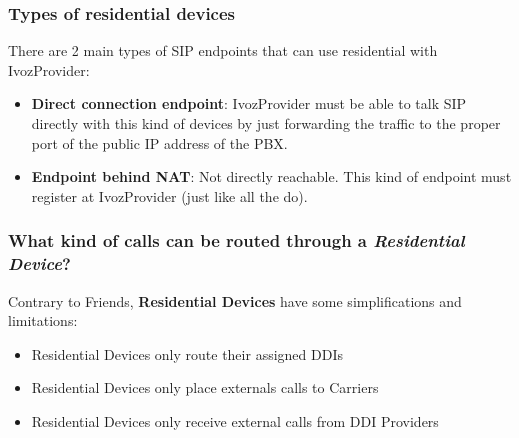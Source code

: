 \documentclass[letterpaper,10pt,english]{sphinxmanual}
\begin{document}
\subsubsection{Types of residential devices}
\label{administration_portal/client/residential/residential_devices:types-of-residential-devices}
There are 2 main types of SIP endpoints that can use residential with IvozProvider:
\begin{itemize}
\item {} 
\textbf{Direct connection endpoint}: IvozProvider must be able to talk SIP directly with
this kind of devices by just forwarding the traffic to the proper port of
the public IP address of the PBX.

\item {} 
\textbf{Endpoint behind NAT}: Not directly reachable. This kind of endpoint must register at
IvozProvider (just like all the {\hyperref[administration_portal/client/vpbx/terminals:terminals]{}} do).

\end{itemize}


\subsubsection{What kind of calls can be routed through a \emph{Residential Device}?}
\label{administration_portal/client/residential/residential_devices:what-kind-of-calls-can-be-routed-through-a-residential-device}
Contrary to Friends, \textbf{Residential Devices} have some simplifications and limitations:
\begin{itemize}
\item {} 
Residential Devices only route their assigned DDIs

\item {} 
Residential Devices only place externals calls to Carriers

\item {} 
Residential Devices only receive external calls from DDI Providers

\end{itemize}
\end{document}
